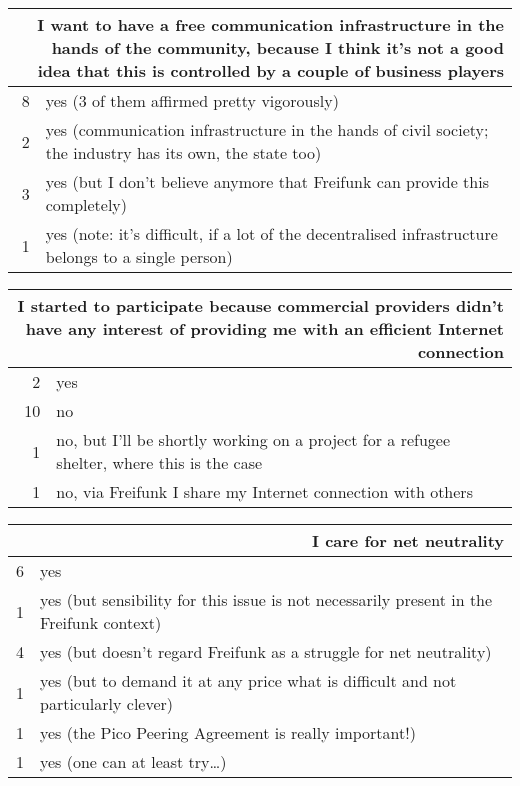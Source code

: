 \begin{table}[h]
  \begin{tabular}{| r | p{\textwidth} |}
    \hline
    \multicolumn{2}{|p{\textwidth}|}{I want to have a free communication infrastructure in the hands of the community, because I think it's not a good idea that this is controlled by a couple of business players} \\
    \hline
    8 & yes (3 of them affirmed pretty vigorously) \\
    2 & yes (communication infrastructure in the hands of civil society; the industry has its own, the state too) \\
    3 & yes (but I don't believe anymore that Freifunk can provide this completely) \\
    1 & yes (note: it's difficult, if a lot of the decentralised infrastructure belongs to a single person) \\
    \hline
  \end{tabular}
\end{table}

\begin{table}[h]
  \begin{tabular}{| r | p{\textwidth} |}
    \hline
    \multicolumn{2}{|p{\textwidth}|}{I started to participate because commercial providers didn't have any interest of providing me with an efficient Internet connection} \\
    \hline
    2  & yes \\
    10 & no \\
    1  & no, but I'll be shortly working on a project for a refugee shelter, where this is the case \\
    1  & no, via Freifunk I share my Internet connection with others \\
    \hline
  \end{tabular}
\end{table}

\begin{table}[h]
  \begin{tabular}{| r | p{\textwidth} |}
    \hline
    \multicolumn{2}{|p{\textwidth}|}{I care for net neutrality} \\
    \hline
    6 & yes \\
    1 & yes (but sensibility for this issue is not necessarily present in the Freifunk context) \\
    4 & yes (but doesn't regard Freifunk as a struggle for net neutrality) \\
    1 & yes (but to demand it at any price what is difficult and not particularly clever) \\
    1 & yes (the Pico Peering Agreement is really important!) \\
    1 & yes (one can at least try\ldots) \\
    \hline
  \end{tabular}
\end{table}

